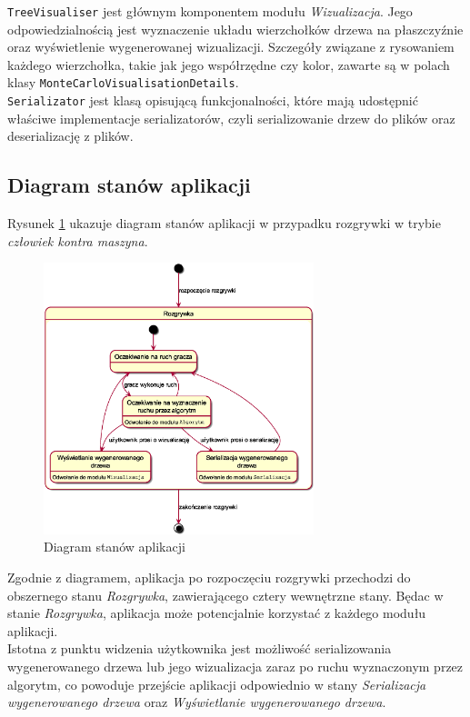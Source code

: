 \documentclass{article}
\newcommand{\code}[1]{\colorbox{light-gray}{\texttt{#1}}}
\newcommand{\modulename}[1]{\textit{#1}}
\begin{document}
\clearpage

\noindent \code{TreeVisualiser} jest głównym komponentem modułu \modulename{Wizualizacja}. Jego odpowiedzialnością jest wyznaczenie układu wierzchołków drzewa na płaszczyźnie oraz wyświetlenie wygenerowanej wizualizacji. Szczegóły związane z rysowaniem każdego wierzchołka, takie jak jego współrzędne czy kolor, zawarte są w polach klasy \code{MonteCarloVisualisationDetails}.\\

\noindent \code{Serializator} jest klasą opisującą funkcjonalności, które mają udostępnić właściwe implementacje serializatorów, czyli serializowanie drzew do plików oraz deserializację z plików.


\subsection{Diagram stanów aplikacji}
\noindent Rysunek \ref{rys:statediagram} ukazuje diagram stanów aplikacji w przypadku rozgrywki w trybie \modulename{człowiek kontra maszyna}. 
\begin{figure}[h]
	\centering
	\includegraphics[width=0.7\textwidth]{statediagram}
	\caption{Diagram stanów aplikacji}
	\label{rys:statediagram}
\end{figure}

\noindent Zgodnie z diagramem, aplikacja po rozpoczęciu rozgrywki przechodzi do obszernego stanu \modulename{Rozgrywka}, zawierającego cztery wewnętrzne stany. Będac w stanie \modulename{Rozgrywka}, aplikacja może potencjalnie korzystać z każdego modułu aplikacji. \\

\noindent Istotna z punktu widzenia użytkownika jest możliwość serializowania wygenerowanego drzewa lub jego wizualizacja zaraz po ruchu wyznaczonym przez algorytm, co powoduje przejście aplikacji odpowiednio w stany \modulename{Serializacja wygenerowanego drzewa} oraz \modulename{Wyświetlanie wygenerowanego drzewa}.
\clearpage
\end{document}
